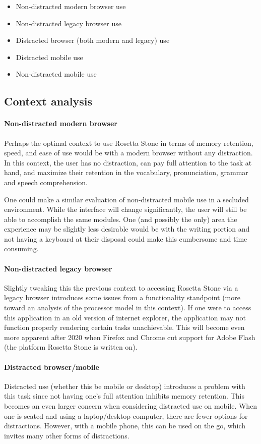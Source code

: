 \begin{itemize}
\item
  Non-distracted modern browser use
\item
  Non-distracted legacy browser use
\item
  Distracted browser (both modern and legacy) use
\item
  Distracted mobile use
\item
  Non-distracted mobile use
\end{itemize}

\subsection{Context analysis}

\paragraph{Non-distracted modern browser}
Perhaps the optimal context to use Rosetta Stone in terms of memory retention, speed, and ease of use would be with a modern browser without any distraction. In this context, the user has no distraction, can pay full attention to the task at hand, and maximize their retention in the vocabulary, pronunciation, grammar and speech comprehension.

One could make a similar evaluation of non-distracted mobile use in a secluded environment. While the interface will change significantly, the user will still be able to accomplish the same modules. One (and possibly the only) area the experience may be slightly less desirable would be with the writing portion and not having a keyboard at their disposal could make this cumbersome and time consuming.

\paragraph{Non-distracted legacy browser}
Slightly tweaking this the previous context to accessing Rosetta Stone via a legacy browser introduces some issues from a functionality standpoint (more toward an analysis of the processor model in this context). If one were to access this application in an old version of internet explorer, the application may not function properly rendering certain tasks unachievable. This will become even more apparent after 2020 when Firefox and Chrome cut support for Adobe Flash (the platform Rosetta Stone is written on).

\paragraph{Distracted browser/mobile}
Distracted use (whether this be mobile or desktop) introduces a problem with this task since not having one's full attention inhibits memory retention. This becomes an even larger concern when considering distracted use on mobile. When one is seated and using a laptop/desktop computer, there are fewer options for distractions. However, with a mobile phone, this can be used on the go, which invites many other forms of distractions.

